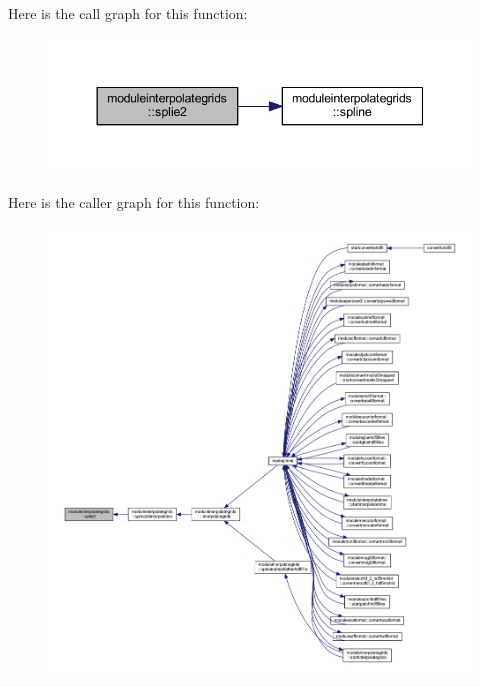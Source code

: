 Here is the call graph for this function\+:\nopagebreak
\begin{figure}[H]
\begin{center}
\leavevmode
\includegraphics[width=344pt]{namespacemoduleinterpolategrids_aaaaf0fdabdeb343cb80f4c083588e3ec_cgraph}
\end{center}
\end{figure}
Here is the caller graph for this function\+:\nopagebreak
\begin{figure}[H]
\begin{center}
\leavevmode
\includegraphics[width=350pt]{namespacemoduleinterpolategrids_aaaaf0fdabdeb343cb80f4c083588e3ec_icgraph}
\end{center}
\end{figure}
\mbox{\label{namespacemoduleinterpolategrids_a3af6dc367d6a4dfa5e4250dcb85ab37f}} 

